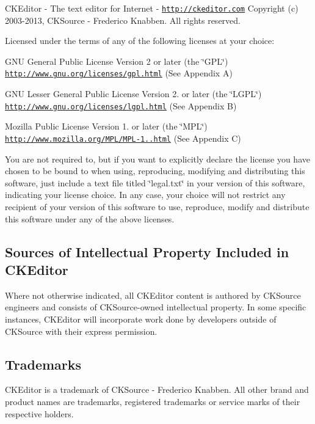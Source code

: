 C\-K\-Editor -\/ The text editor for Internet -\/ \href{http://ckeditor.com}{\tt http\-://ckeditor.\-com} Copyright (c) 2003-\/2013, C\-K\-Source -\/ Frederico Knabben. All rights reserved.

Licensed under the terms of any of the following licenses at your choice\-:
\begin{DoxyItemize}
\item G\-N\-U General Public License Version 2 or later (the \char`\"{}\-G\-P\-L\char`\"{}) \href{http://www.gnu.org/licenses/gpl.html}{\tt http\-://www.\-gnu.\-org/licenses/gpl.\-html} (See Appendix A)
\item G\-N\-U Lesser General Public License Version 2. or later (the \char`\"{}\-L\-G\-P\-L\char`\"{}) \href{http://www.gnu.org/licenses/lgpl.html}{\tt http\-://www.\-gnu.\-org/licenses/lgpl.\-html} (See Appendix B)
\item Mozilla Public License Version 1. or later (the \char`\"{}\-M\-P\-L\char`\"{}) \href{http://www.mozilla.org/MPL/MPL-1.1.html}{\tt http\-://www.\-mozilla.\-org/\-M\-P\-L/\-M\-P\-L-\/1..\-html} (See Appendix C)
\end{DoxyItemize}

You are not required to, but if you want to explicitly declare the license you have chosen to be bound to when using, reproducing, modifying and distributing this software, just include a text file titled \char`\"{}legal.\-txt\char`\"{} in your version of this software, indicating your license choice. In any case, your choice will not restrict any recipient of your version of this software to use, reproduce, modify and distribute this software under any of the above licenses.

\subsection*{Sources of Intellectual Property Included in C\-K\-Editor }

Where not otherwise indicated, all C\-K\-Editor content is authored by C\-K\-Source engineers and consists of C\-K\-Source-\/owned intellectual property. In some specific instances, C\-K\-Editor will incorporate work done by developers outside of C\-K\-Source with their express permission.

\subsection*{Trademarks }

C\-K\-Editor is a trademark of C\-K\-Source -\/ Frederico Knabben. All other brand and product names are trademarks, registered trademarks or service marks of their respective holders. 



